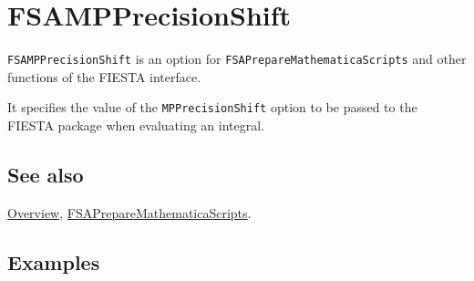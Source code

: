 \documentclass[../FeynHelpersManual.tex]{subfiles}
\begin{document}
\begin{Shaded}
\begin{Highlighting}[]
 
\end{Highlighting}
\end{Shaded}

\hypertarget{fsampprecisionshift}{
\section{FSAMPPrecisionShift}\label{fsampprecisionshift}}

\texttt{FSAMPPrecisionShift} is an option for
\texttt{FSAPrepareMathematicaScripts} and other functions of the FIESTA
interface.

It specifies the value of the \texttt{MPPrecisionShift} option to be
passed to the FIESTA package when evaluating an integral.

\subsection{See also}

\hyperlink{toc}{Overview},
\hyperlink{fsapreparemathematicascripts}{FSAPrepareMathematicaScripts}.

\subsection{Examples}
\end{document}
